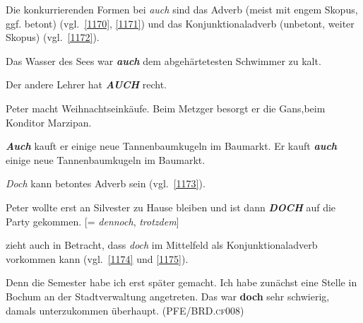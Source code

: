 Die konkurrierenden Formen bei \textit{auch} sind das  Adverb (meist mit engem Skopus, ggf. betont) (vgl.\ \ref{1170}, \ref{1171}) und das Konjunktionaladverb (unbetont, weiter Skopus) (vgl.\ \ref{1172}). 

\begin{exe}
	\ex\label{1170} 
	Das Wasser des Sees war \textbf{\textit{auch}} dem abgehärtetesten Schwimmer zu kalt.\\\relax
	[= \textit{sogar}, \textit{selbst}, \textit{ebenfalls}]
	\hfill\hbox{\citet[92]{Helbig1990}}
\end{exe}

\begin{exe}
	\ex\label{1171} 
	Der andere Lehrer hat \textbf{\textit{AUCH}} recht.\\\relax
	[= \textit{ebenfalls}, \textit{gleichfalls}]
	\hfill\hbox{\citet[22]{Mueller2014b}}
\end{exe}							
			
\begin{exe}
	\ex\label{1172} 
	Peter macht Weihnachtseinkäufe. Beim Metzger besorgt er die Gans,\linebreak beim Konditor Marzipan. 
		\begin{xlist}
			\ex\label{1172a} \textbf{\textit{Auch}} kauft er einige neue Tannenbaumkugeln im Baumarkt.
			\ex\label{1172b} Er kauft \textbf{\textit{auch}} einige neue Tannenbaumkugeln im Baumarkt.\\\relax
			[= \textit{außerdem}, \textit{zusätzlich}]
		\hfill\hbox{\citet[22]{Mueller2014b}}	
		\end{xlist}		
\end{exe}
\textit{Doch} kann betontes Adverb sein (vgl.\ \ref{1173}).

\begin{exe}
	\ex\label{1173} 
	Peter wollte erst an Silvester zu Hause bleiben und ist dann \textbf{\textit{DOCH}} auf die Party gekommen. [= \textit{dennoch}, \textit{trotzdem}]
\end{exe}	
\citet[84]{Kwon2005} zieht auch in Betracht, dass \textit{doch} im Mittelfeld als Konjunktio\-naladverb  vorkommen kann (vgl.\ \ref{1174} und \ref{1175}).
	
\begin{exe}
	\ex\label{1174} 

	Denn die Semester habe ich erst später gemacht. Ich habe zunächst eine Stelle in Bochum an der Stadtverwaltung angetreten. Das war \textbf{doch} sehr 		schwierig, damals unterzukommen überhaupt. 
	\hfill\hbox{(\scshape PFE/BRD.cf008)}
\end{exe}	
			

